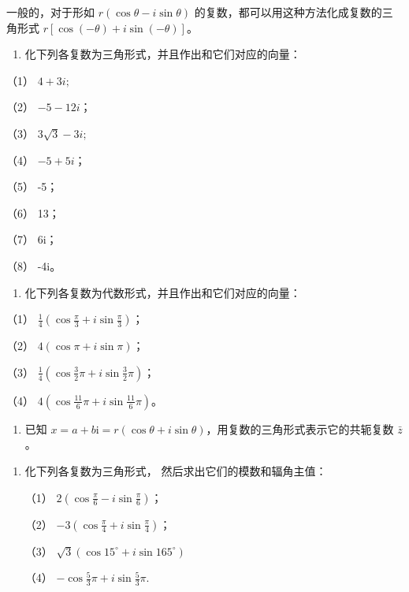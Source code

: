 一般的，对于形如 \(r(\cos \theta - i\sin \theta)\)
的复数，都可以用这种方法化成复数的三角形式
\(r[\cos (-\theta) + i\sin (-\theta)]\)。

\begin{enumerate}
\item
  化下列各复数为三角形式，并且作出和它们对应的向量：
\end{enumerate}

（1） \(4 + 3i;\)

（2） \(-5 - 12i\)；

（3） \(3\sqrt{3} - 3i;\)

（4） \(-5 + 5i\)；

（5） -5；

（6） 13；

（7） 6i；

（8） -4i。

\begin{enumerate}[start=2]
\item
  化下列各复数为代数形式，并且作出和它们对应的向量：
\end{enumerate}

（1）
\(\frac{1}{4}\left(\cos \frac{\pi}{3} + i\sin \frac{\pi}{3}\right)\)；

（2） \(4(\cos \pi + i \sin \pi)\)；

（3）
\(\frac{1}{4}\left(\cos \frac{3}{2}\pi + i\sin \frac{3}{2}\pi\right)\)；

（4） \(4\left(\cos \frac{11}{6}\pi + i\sin \frac{11}{6}\pi\right)\)。

\begin{enumerate}[start=3]
\item
  已知
  \(x = a + b\mathrm{i} = r(\cos \theta + i\sin \theta)\)，用复数的三角形式表示它的共轭复数
  \(\bar{z}\)。
\end{enumerate}

\begin{enumerate}[start=4,label={*\arabic*.}]
\item
  化下列各复数为三角形式， 然后求出它们的模数和辐角主值：

（1） \(2\left(\cos \frac{\pi}{6} - i \sin \frac{\pi}{6}\right)\)；

（2） \(-3\left(\cos \frac{\pi}{4} + i \sin \frac{\pi}{4}\right)\)；

（3） \(\sqrt{3} (\cos 15^{\circ} + i\sin 165^{\circ})\)

（4） \(-\cos \frac{5}{3}\pi + i\sin \frac{5}{3}\pi.\)

\end{enumerate}
